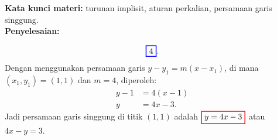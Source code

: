 \documentclass[10pt,openany,a4paper]{article}
\theoremstyle{definition}
\theoremstyle{definition}
\theoremstyle{plain}
\newenvironment{jawab}[2][tes]{%
\par\noindent\textbf{Kata kunci materi:} #1.\\
\textbf{Penyelesaian:} #2%
}{}
\begin{document}
\begin{enumerate}
\begin{jawab}[turunan implisit, aturan perkalian, persamaan garis singgung]
{\begin{enumerate}
\begin{align*}
        \color{blue}
        \setlength{\fboxrule}{1pt} \boxed{\color{oldcolor}4}\color{oldcolor}.
            \end{align*}
            Dengan menggunakan persamaan garis $y - y_1 = m(x - x_1)$, di mana $(x_1,y_1)=(1,1)$ dan $m=4$, diperoleh:
            \begin{align*}
                y - 1 &= 4(x - 1)\\
                y &= 4x - 3.
            \end{align*}
            Jadi persamaan garis singgung di titik $(1,1)$ adalah $\colorlet{oldcolor}{.}
        \color{red}
        \setlength{\fboxrule}{1pt} \boxed{\color{oldcolor}y = 4x - 3}\color{oldcolor}$ atau $4x-y=3$.
        \end{enumerate}
    }
    \end{jawab}
\end{enumerate}

\newpage
\end{document}
